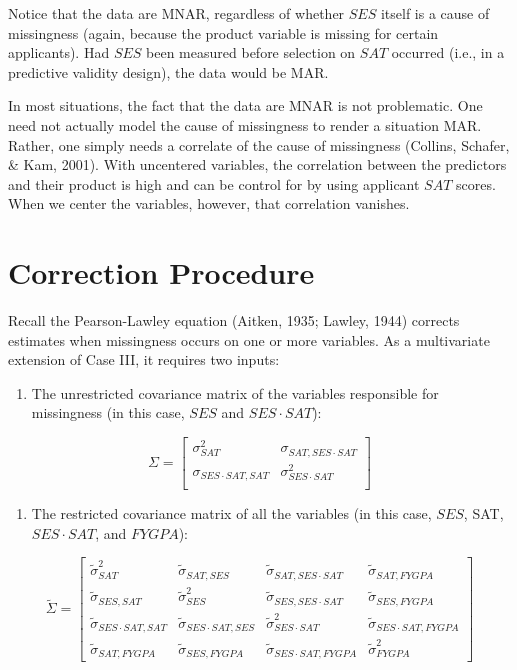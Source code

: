 \documentclass[english,man]{apa6}
\providecommand{\tightlist}{%
  \setlength{\itemsep}{0pt}\setlength{\parskip}{0pt}}
\theoremstyle{definition}
\theoremstyle{definition}
\theoremstyle{remark}
\begin{document}
Notice that the data are MNAR, regardless of whether \(SES\) itself is a
cause of missingness (again, because the product variable is missing for
certain applicants). Had \(SES\) been measured before selection on
\(SAT\) occurred (i.e., in a predictive validity design), the data would
be MAR.

In most situations, the fact that the data are MNAR is not problematic.
One need not actually model the cause of missingness to render a
situation MAR. Rather, one simply needs a correlate of the cause of
missingness (Collins, Schafer, \& Kam, 2001). With uncentered variables,
the correlation between the predictors and their product is high and can
be control for by using applicant \(SAT\) scores. When we center the
variables, however, that correlation vanishes.

\section{Correction Procedure}\label{correction-procedure}

Recall the Pearson-Lawley equation (Aitken, 1935; Lawley, 1944) corrects
estimates when missingness occurs on one or more variables. As a
multivariate extension of Case III, it requires two inputs:

\begin{enumerate}
\def\labelenumi{(\arabic{enumi})}
\tightlist
\item
  The unrestricted covariance matrix of the variables responsible for
  missingness (in this case, \(SES\) and \(SES\cdot SAT\)):
\end{enumerate}

\[
   \Sigma=
  \left[ {\begin{array}{ccc}
   \sigma^2_{SAT} & \sigma_{SAT,SES\cdot SAT} \\
    \sigma_{SES\cdot SAT, SAT} & \sigma^2_{SES \cdot SAT}  \\
  \end{array} } \right]
\]

\begin{enumerate}
\def\labelenumi{(\arabic{enumi})}
\setcounter{enumi}{1}
\tightlist
\item
  The restricted covariance matrix of all the variables (in this case,
  \(SES\), SAT, \(SES \cdot SAT\), and \(FYGPA\)):
\end{enumerate}

\[
   \widetilde{\Sigma}=
  \left[ {\begin{array}{cccc}
   \tilde{\sigma}^2_{SAT} & \tilde{\sigma}_{SAT,{SES}} & \tilde{\sigma}_{SAT,SES\cdot SAT} & \tilde{\sigma}_{SAT, FYGPA}\\
    \tilde{\sigma}_{SES,SAT} & \tilde{\sigma}^2_{SES} & \tilde{\sigma}_{SES,SES\cdot SAT} & \tilde{\sigma}_{SES, FYGPA} \\
    \tilde{\sigma}_{SES\cdot SAT,SAT} &\tilde{\sigma}_{SES\cdot SAT,SES} & \tilde{\sigma}^2_{SES\cdot SAT} & \tilde{\sigma}_{SES\cdot SAT, FYGPA} \\
     \tilde{\sigma}_{SAT, FYGPA} & \tilde{\sigma}_{SES, FYGPA} & \tilde{\sigma}_{SES\cdot SAT, FYGPA} & \tilde{\sigma}^2_{FYGPA}
  \end{array} } \right]
\]
\end{document}
